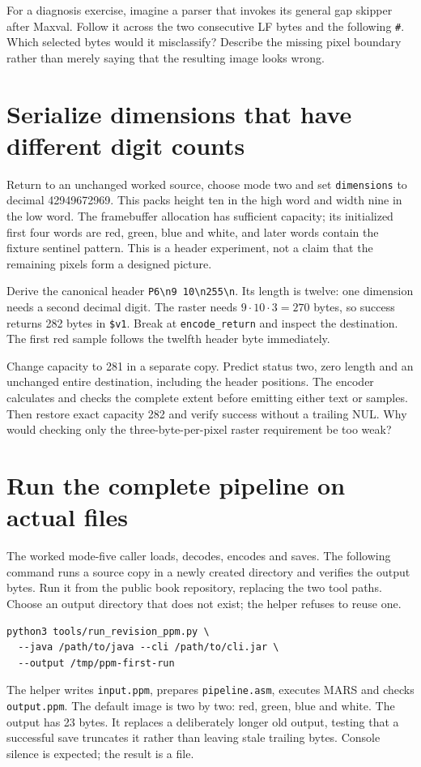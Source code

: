 For a diagnosis exercise, imagine a parser that invokes its general gap skipper
after Maxval. Follow it across the two consecutive LF bytes and the following
\texttt{\#}. Which selected bytes would it misclassify? Describe the missing
pixel boundary rather than merely saying that the resulting image looks wrong.

\section{Serialize dimensions that have different digit counts}

Return to an unchanged worked source, choose mode two and set
\texttt{dimensions} to decimal 42949672969. This packs height ten in the high
word and width nine in the low word. The framebuffer allocation has sufficient
capacity; its initialized first four words are red, green, blue and white, and
later words contain the fixture sentinel pattern. This is a header experiment,
not a claim that the remaining pixels form a designed picture.

Derive the canonical header \texttt{P6\textbackslash n9 10\textbackslash n255\textbackslash n}.
Its length is twelve: one dimension needs a second decimal digit. The raster
needs $9\cdot10\cdot3=270$ bytes, so success returns 282 bytes in
\texttt{\$v1}. Break at \texttt{encode\_return} and inspect the destination.
The first red sample follows the twelfth header byte immediately.



Change capacity to 281 in a separate copy. Predict status two, zero length and
an unchanged entire destination, including the header positions. The encoder
calculates and checks the complete extent before emitting either text or samples.
Then restore exact capacity 282 and verify success without a trailing NUL.
Why would checking only the three-byte-per-pixel raster requirement be too weak?

\section{Run the complete pipeline on actual files}

The worked mode-five caller loads, decodes, encodes and saves. The following
command runs a source copy in a newly created directory and verifies the output
bytes. Run it from the public book repository, replacing the two tool paths.
Choose an output directory that does not exist; the helper refuses to reuse one.
\begin{verbatim}
python3 tools/run_revision_ppm.py \
  --java /path/to/java --cli /path/to/cli.jar \
  --output /tmp/ppm-first-run
\end{verbatim}
The helper writes \texttt{input.ppm}, prepares \texttt{pipeline.asm}, executes
MARS and checks \texttt{output.ppm}. The default image is two by two: red, green,
blue and white. The output has 23 bytes. It replaces a deliberately longer old
output, testing that a successful save truncates it rather than leaving stale
trailing bytes. Console silence is expected; the result is a file.

